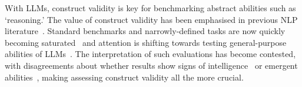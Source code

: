 With LLMs, construct validity is key for benchmarking abstract abilities such as `reasoning.' The value of construct validity has been emphasised in previous NLP literature~\cite{bowmanWhatWillIt2021, rajiAIEverythingWhole2021a}. Standard benchmarks and narrowly-defined tasks are now quickly becoming saturated~\cite{kielaDynabenchRethinkingBenchmarking2021d} and attention is shifting towards testing general-purpose abilities of LLMs~\cite{wangSuperGLUEStickierBenchmark2019,singhGlobalMMLUUnderstanding2025}. The interpretation of such evaluations has become contested, with disagreements about whether results show signs of intelligence~\cite{bubeckSparksArtificialGeneral2023, mccoyEmbersAutoregressionUnderstanding2023b} or emergent abilities~\cite{schaefferAreEmergentAbilities2023a,  weiEmergentAbilitiesLarge2022}, making assessing construct validity all the more crucial.